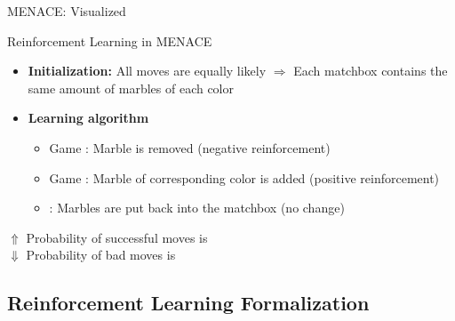 \begin{frame}{MENACE: Visualized}{}
	
\end{frame}


\begin{frame}{Reinforcement Learning in MENACE}{}
	\begin{itemize}
		\item \textbf{Initialization:} All moves are equally likely $\Rightarrow$ Each matchbox contains the same amount
			of marbles of each color
		\item \textbf{Learning algorithm}
		\begin{itemize}
			\item Game : Marble is removed (negative reinforcement)
			\item Game : Marble of corresponding color is added (positive reinforcement)
			\item {}: Marbles are put back into the matchbox (no change)
		\end{itemize}
	\end{itemize}
	
	\begin{boxBlueNoFrame}
		$\bm{\Uparrow}$ Probability of successful moves is  \\
		$\bm{\Downarrow}$ Probability of bad moves is 
	\end{boxBlueNoFrame}
\end{frame}


\subsection{Reinforcement Learning Formalization}

